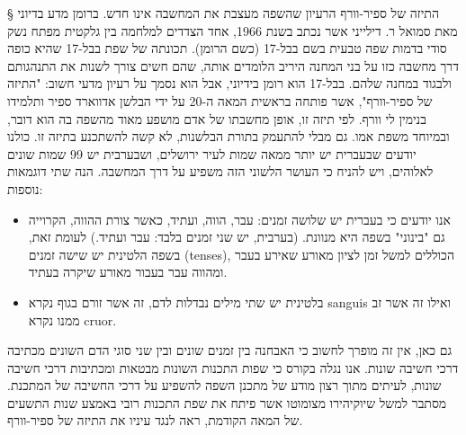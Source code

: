 § התיזה של ספיר-וורף
הרעיון שהשפה מעצבת את המחשבה אינו חדש. ברומן מדע בדיוני מאת סמואל ר. דילייני
אשר נכתב בשנת 1966, אחד הצדדים למלחמה בין גלקטית מפתח נשק סודי בדמות שפה טבעית
בשם בבל-17 (כשם הרומן). תכונתה של שפת בבל-17 שהיא כופה דרך מחשבה כזו על בני
המחנה היריב הלומדים אותה, שהם חשים צורך לשנות את התנהגותם ולבגוד במחנה שלהם.
בבל-17 הוא רומן בידיוני, אבל הוא נסמך על רעיון מדעי חשוב: "התיזה של ספיר-וורף",
אשר פותחה בראשית המאה ה-20 על ידי הבלשן אדווארד ספיר ותלמידו בנימין לי וורף.
לפי תיזה זו, אופן מחשבתו של אדם מושפע מאוד מהשפה בה הוא דובר, ובמיוחד משפת אמו.
גם מבלי להתעמק בתורת הבלשנות, לא קשה להשתכנע בתיזה זו. כולנו יודעים שבעברית יש
יותר ממאה שמות לעיר ירושלים, ושבערבית יש 99 שמות שונים לאלוהים, ויש להניח כי
העושר הלשוני הזה משפיע על דרך המחשבה. 
הנה שתי דוגמאות נוספות:
\begin{itemize}
         \item אנו יודעים כי בעברית יש שלושה זמנים: עבר, הווה, ועתיד, כאשר צורת
           ההווה, הקרוייה גם "בינוני" בשפה היא מנוונת. (בערבית, יש שני זמנים
           בלבד: עבר ועתיד.) לעומת זאת, בשפה הלטינית יש שישה זמנים (tenses),
           הכוללים למשל זמן לציון מאורע שאירע בעבר ומהווה עבר בעבור מאורע שיקרה
           בעתיד.  
         \item בלטינית יש שתי מילים נבדלות לדם, זה אשר זורם בגוף נקרא sanguis
       ואילו זה אשר זב ממנו נקרא cruor.  
   \end{itemize}
גם כאן, אין זה מופרך לחשוב  כי האבחנה בין זמנים שונים ובין שני סוגי הדם השונים
מכתיבה דרכי חשיבה שונות.  אנו נגלה בקורס כי שפות התכנות השונות מבטאות ומכתיבות
דרכי חשיבה שונות, לעיתים מתוך רצון מודע של מתכנן השפה להשפיע על דרכי החשיבה של
המתכנת. מסתבר למשל שיוקיהירו מצומוטו אשר פיתח את שפת התכנות רובי באמצע שנות
התשעים של המאה הקודמת, ראה לנגד עיניו את התיזה של ספיר-וורף.

